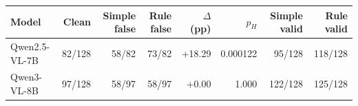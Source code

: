 \begin{tabular}{lrrrrrrr}
\toprule
Model & Clean & Simple false & Rule false & $\Delta$ (pp) & $p_H$ & Simple valid & Rule valid \\
\midrule
Qwen2.5-VL-7B & 82/128 & 58/82 & 73/82 & +18.29 & 0.000122 & 95/128 & 118/128 \\
Qwen3-VL-8B & 97/128 & 58/97 & 58/97 & +0.00 & 1.000 & 122/128 & 125/128 \\
\bottomrule
\end{tabular}
